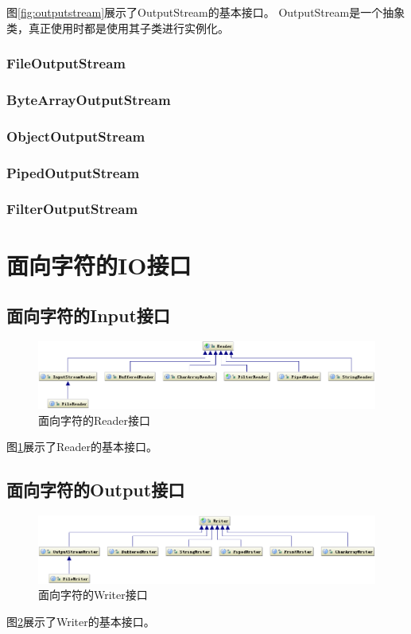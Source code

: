 图\ref{fig:outputstream}展示了OutputStream的基本接口。
OutputStream是一个抽象类，真正使用时都是使用其子类进行实例化。
\subsubsection[FileOutputStream]{FileOutputStream}
\subsubsection[ByteArrayOutputStream]{ByteArrayOutputStream}
\subsubsection[ObjectOutputStream]{ObjectOutputStream}
\subsubsection[PipedOutputStream]{PipedOutputStream}
\subsubsection[FilterOutputStream]{FilterOutputStream}


\section[面向字符的IO接口]{面向字符的IO接口}
\subsection[面向字符的Input接口]{面向字符的Input接口}
\begin{figure}
  \centering
  \includegraphics[width=.9\textwidth]{picturedir/reader.png}
  \caption{面向字符的Reader接口}
  \label{fig:reader}
\end{figure}

图\ref{fig:reader}展示了Reader的基本接口。

\subsection[面向字符的Output接口]{面向字符的Output接口}
\begin{figure}
  \centering
  \includegraphics[width=.9\textwidth]{picturedir/writer.png}
  \caption{面向字符的Writer接口}
  \label{fig:writer}
\end{figure}

图\ref{fig:writer}展示了Writer的基本接口。
